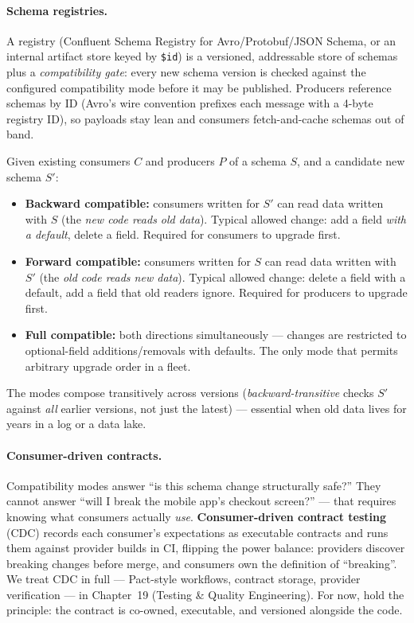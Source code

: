 \paragraph{Schema registries.}
A registry (Confluent Schema Registry for Avro/Protobuf/JSON Schema, or an internal
artifact store keyed by \texttt{\$id}) is a versioned, addressable store of schemas
plus a \emph{compatibility gate}: every new schema version is checked against the
configured compatibility mode before it may be published. Producers reference
schemas by ID (Avro's wire convention prefixes each message with a 4-byte registry
ID), so payloads stay lean and consumers fetch-and-cache schemas out of band.

\begin{definition}
Given existing consumers $C$ and producers $P$ of a schema $S$, and a candidate new
schema $S'$:
\begin{itemize}
  \item \textbf{Backward compatible:} consumers written for $S'$ can read data
        written with $S$ (the \emph{new code reads old data}). Typical allowed
        change: add a field \emph{with a default}, delete a field. Required for
        consumers to upgrade first.
  \item \textbf{Forward compatible:} consumers written for $S$ can read data written
        with $S'$ (the \emph{old code reads new data}). Typical allowed change:
        delete a field with a default, add a field that old readers ignore. Required
        for producers to upgrade first.
  \item \textbf{Full compatible:} both directions simultaneously --- changes are
        restricted to optional-field additions/removals with defaults. The only mode
        that permits arbitrary upgrade order in a fleet.
\end{itemize}
\end{definition}

The modes compose transitively across versions (\emph{backward-transitive} checks
$S'$ against \emph{all} earlier versions, not just the latest) --- essential when
old data lives for years in a log or a data lake.

\paragraph{Consumer-driven contracts.}
Compatibility modes answer ``is this schema change structurally safe?'' They cannot
answer ``will I break the mobile app's checkout screen?'' --- that requires knowing
what consumers actually \emph{use}. \textbf{Consumer-driven contract testing} (CDC)
records each consumer's expectations as executable contracts and runs them against
provider builds in CI, flipping the power balance: providers discover breaking
changes before merge, and consumers own the definition of ``breaking''. We treat
CDC in full --- Pact-style workflows, contract storage, provider verification --- in
Chapter~19 (Testing \& Quality Engineering). For now, hold the principle: the
contract is co-owned, executable, and versioned alongside the code.

